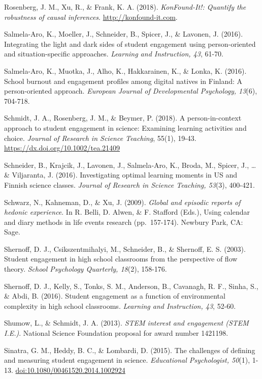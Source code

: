 \documentclass[]{msu-thesis}
\theoremstyle{definition}
\theoremstyle{definition}
\theoremstyle{definition}
\theoremstyle{remark}
\begin{document}
Rosenberg, J. M., Xu, R., \& Frank, K. A. (2018). \emph{KonFound-It!:
Quantify the robustness of causal inferences}.
\url{http://konfound-it.com}.

Salmela-Aro, K., Moeller, J., Schneider, B., Spicer, J., \& Lavonen, J.
(2016). Integrating the light and dark sides of student engagement using
person-oriented and situation-specific approaches. \emph{Learning and
Instruction, 43}, 61-70.

Salmela-Aro, K., Muotka, J., Alho, K., Hakkarainen, K., \& Lonka, K.
(2016). School burnout and engagement profiles among digital natives in
Finland: A person-oriented approach. \emph{European Journal of
Developmental Psychology, 13}(6), 704-718.

Schmidt, J. A., Rosenberg, J. M., \& Beymer, P. (2018). A
person-in-context approach to student engagement in science: Examining
learning activities and choice. \emph{Journal of Research in Science
Teaching}, 55(1), 19-43. \url{https://dx.doi.org/10.1002/tea.21409}

Schneider, B., Krajcik, J., Lavonen, J., Salmela‐Aro, K., Broda, M.,
Spicer, J., \ldots{} \& Viljaranta, J. (2016). Investigating optimal
learning moments in US and Finnish science classes. \emph{Journal of
Research in Science Teaching, 53}(3), 400-421.

Schwarz, N., Kahneman, D., \& Xu, J. (2009). \emph{Global and episodic
reports of hedonic experience}. In R. Belli, D. Alwen, \& F. Stafford
(Eds.), Using calendar and diary methods in life events research
(pp.~157-174). Newbury Park, CA: Sage.

Shernoff, D. J., Csikszentmihalyi, M., Schneider, B., \& Shernoff, E. S.
(2003). Student engagement in high school classrooms from the
perspective of flow theory. \emph{School Psychology Quarterly, 18}(2),
158-176.

Shernoff, D. J., Kelly, S., Tonks, S. M., Anderson, B., Cavanagh, R. F.,
Sinha, S., \& Abdi, B. (2016). Student engagement as a function of
environmental complexity in high school classrooms. \emph{Learning and
Instruction, 43}, 52-60.

Shumow, L., \& Schmidt, J. A. (2013). \emph{STEM interest and engagement
(STEM I.E.)}. National Science Foundation proposal for award number
1421198.

Sinatra, G. M., Heddy, B. C., \& Lombardi, D. (2015). The challenges of
defining and measuring student engagement in science. \emph{Educational
Psychologist, 50}(1), 1-13. \url{doi:10.1080/00461520.2014.1002924}
\end{document}
